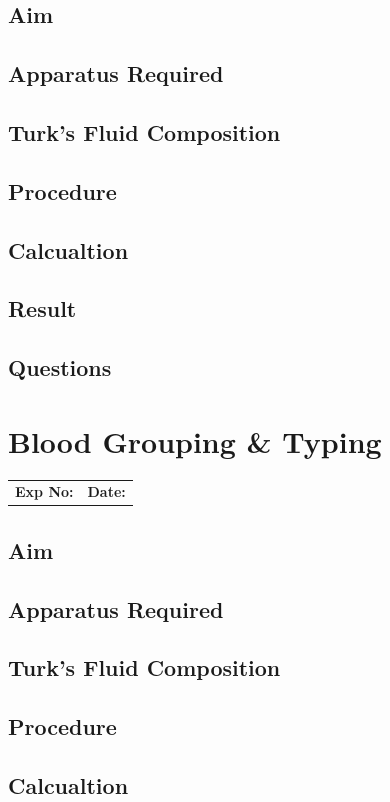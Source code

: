 \documentclass[a4paper,12pt]{book}
\begin{document}
					\section*{Aim}
					\section*{Apparatus Required}
					\section*{Turk's Fluid Composition}
					\section*{Procedure}
					\section*{Calcualtion}
					\section*{Result}
					\section*{Questions}

					\chapter*{\centering Blood Grouping \& Typing}
					\begin{tabular}{p{5in} p{1in}}
						\textbf{Exp No:}  & \textbf{Date:}\\
					\end{tabular}

					\section*{Aim}
					\section*{Apparatus Required}
					\section*{Turk's Fluid Composition}
					\section*{Procedure}
					\section*{Calcualtion}
\end{document}
